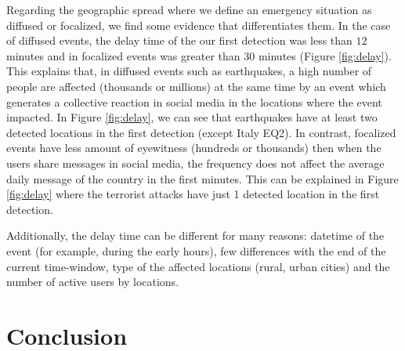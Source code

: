\documentclass[sigconf]{acmart}
\begin{document}
Regarding the geographic spread where we define an emergency situation as diffused or focalized, we find some evidence that differentiates them. In the case of diffused events, the delay time of the our first detection was less than $12$ minutes and in focalized events was greater than $30$ minutes (Figure \ref{fig:delay}). This explains that, in diffused events such as earthquakes, a high number of people are affected (thousands or millions) at the same time by an event which generates a collective reaction in social media in the locations where the event impacted. In Figure \ref{fig:delay}, we can see that earthquakes have at least two detected locations in the first detection (except Italy EQ2). In contrast, focalized events have less amount of eyewitness (hundreds or thousands) then when the users share messages in social media, the frequency does not affect the average daily message of the country in the first minutes. This can be explained in Figure \ref{fig:delay} where the terrorist attacks have just 1 detected location in the first detection.

Additionally, the delay time can be different for many reasons: datetime of the event (for example, during the early hours), few differences with the end of the current time-window, type of the affected locations (rural, urban cities) and the number of active users by locations.

	

\section{Conclusion}
\end{document}
